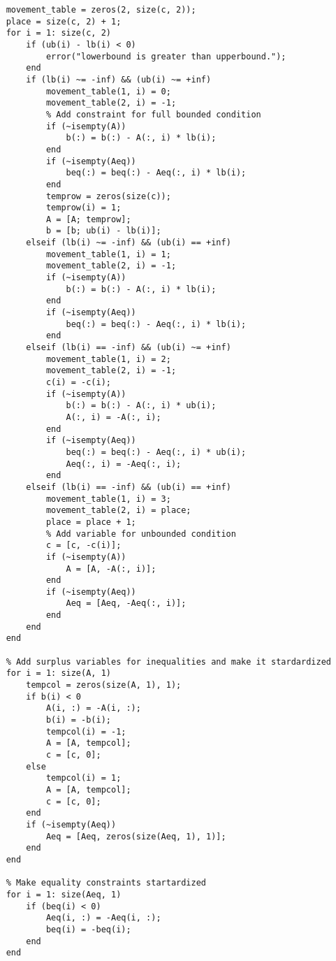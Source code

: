 \documentclass[bwprint, withouttitlepage]{mathexpthesis}
\begin{document}
\begin{verbatim}
    movement_table = zeros(2, size(c, 2));
    place = size(c, 2) + 1;
    for i = 1: size(c, 2)
        if (ub(i) - lb(i) < 0)
            error("lowerbound is greater than upperbound.");
        end       
        if (lb(i) ~= -inf) && (ub(i) ~= +inf)
            movement_table(1, i) = 0;
            movement_table(2, i) = -1;
            % Add constraint for full bounded condition
            if (~isempty(A))
                b(:) = b(:) - A(:, i) * lb(i);
            end
            if (~isempty(Aeq))
                beq(:) = beq(:) - Aeq(:, i) * lb(i);
            end
            temprow = zeros(size(c));
            temprow(i) = 1;
            A = [A; temprow];
            b = [b; ub(i) - lb(i)];
        elseif (lb(i) ~= -inf) && (ub(i) == +inf)
            movement_table(1, i) = 1;
            movement_table(2, i) = -1;
            if (~isempty(A))
                b(:) = b(:) - A(:, i) * lb(i);
            end
            if (~isempty(Aeq))
                beq(:) = beq(:) - Aeq(:, i) * lb(i);
            end 
        elseif (lb(i) == -inf) && (ub(i) ~= +inf)
            movement_table(1, i) = 2;
            movement_table(2, i) = -1;
            c(i) = -c(i);
            if (~isempty(A))
                b(:) = b(:) - A(:, i) * ub(i);
                A(:, i) = -A(:, i);
            end
            if (~isempty(Aeq))
                beq(:) = beq(:) - Aeq(:, i) * ub(i);
                Aeq(:, i) = -Aeq(:, i);
            end
        elseif (lb(i) == -inf) && (ub(i) == +inf)
            movement_table(1, i) = 3;
            movement_table(2, i) = place;
            place = place + 1;
            % Add variable for unbounded condition
            c = [c, -c(i)];
            if (~isempty(A))
                A = [A, -A(:, i)];
            end
            if (~isempty(Aeq))
                Aeq = [Aeq, -Aeq(:, i)];
            end
        end
    end
    
    % Add surplus variables for inequalities and make it stardardized
    for i = 1: size(A, 1)
        tempcol = zeros(size(A, 1), 1);
        if b(i) < 0
            A(i, :) = -A(i, :);
            b(i) = -b(i);
            tempcol(i) = -1;
            A = [A, tempcol];
            c = [c, 0];
        else
            tempcol(i) = 1;
            A = [A, tempcol];
            c = [c, 0];
        end
        if (~isempty(Aeq))
            Aeq = [Aeq, zeros(size(Aeq, 1), 1)];
        end
    end
    
    % Make equality constraints startardized
    for i = 1: size(Aeq, 1)
        if (beq(i) < 0)
            Aeq(i, :) = -Aeq(i, :);
            beq(i) = -beq(i);
        end
    end
    

\end{verbatim}
\end{document}
